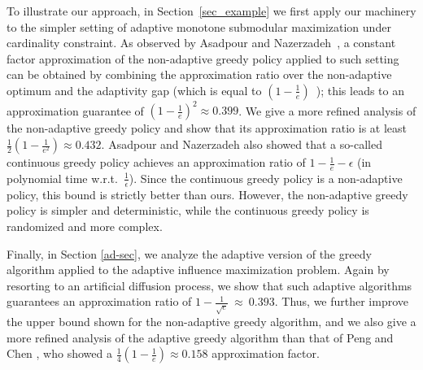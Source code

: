 To illustrate our approach, in Section~\ref{sec_example} we first apply our machinery to the simpler setting of adaptive monotone submodular maximization under cardinality constraint. As observed by Asadpour and Nazerzadeh~\cite{Asadpour16}, a constant factor approximation of the non-adaptive greedy policy applied to such setting can be obtained by combining the approximation ratio over the non-adaptive optimum and the adaptivity gap (which is equal to $\left(1-\frac{1}{e}\right)$~\cite{Asadpour16}); this leads to an approximation guarantee of $\left(1-\frac{1}{e}\right)^2\approx 0.399$. We give a more refined analysis of the non-adaptive greedy policy and show that its approximation ratio is at least $\frac{1}{2}\left(1-\frac{1}{e^2} \right)\approx 0.432$. Asadpour and Nazerzadeh \cite{Asadpour16} also showed that a so-called continuous greedy policy \cite{Calinescu11,CVZ14} achieves an approximation ratio of $1-\frac{1}{e}-\epsilon$ (in polynomial time w.r.t.~$\frac{1}{\epsilon}$). Since the continuous greedy policy is a non-adaptive policy, this bound is strictly better than ours. However, the non-adaptive greedy policy is simpler and deterministic, while the continuous greedy policy is randomized and more complex. 


Finally, in Section \ref{ad-sec}, we analyze the adaptive version of the greedy algorithm applied to the adaptive influence maximization problem. Again by resorting to an artificial diffusion process, we show that such adaptive algorithms guarantees an approximation ratio of $1-\frac{1}{\sqrt{e}} ~\approx~0.393$. Thus, we further improve the upper bound shown for the non-adaptive greedy algorithm, and we also give a more refined analysis of the adaptive greedy algorithm than that of Peng and Chen \cite{Peng2019}, who showed a $\frac{1}{4}\left(1-\frac{1}{e}\right)\approx 0.158$ approximation factor. 



